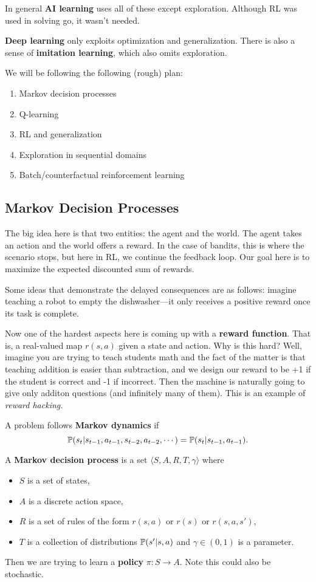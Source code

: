 \documentclass[12pt]{article}
\begin{document}
In general \textbf{AI learning} uses all of these except exploration. Although RL was used in solving go, it wasn't needed.

\textbf{Deep learning} only exploits optimization and generalization. There is also a sense of \textbf{imitation learning}, which also omits exploration.

We will be following the following (rough) plan:
\begin{enumerate}
	\item Markov decision processes
	\item Q-learning
	\item RL and generalization
	\item Exploration in sequential domains 
	\item Batch/counterfactual reinforcement learning
\end{enumerate}

\subsection{Markov Decision Processes}
The big idea here is that two entities: the agent and the world. The agent takes an action and the world offers a reward. In the case of bandits, this is where the scenario stops,
but here in RL, we continue the feedback loop. Our goal here is to maximize the expected discounted sum of rewards.

Some ideas that demonstrate the delayed consequences are as follows: imagine teaching a robot to empty the dishwasher---it only receives a positive reward once its task is complete. 

Now one of the hardest aspects here is coming up with a \textbf{reward function}. That is, a real-valued map $r(s,a)$ given a state and action. Why is this hard?
Well, imagine you are trying to teach students math and the fact of the matter is that teaching addition is easier than subtraction, and we design our reward to be +1 if the student is correct and -1 if incorrect.
Then the machine is naturally going to give only additon questions (and infinitely many of them). This is an example of \textit{reward hacking.}

A problem follows \textbf{Markov dynamics} if 
\[\mathbb{P}(s_t|s_{t-1},a_{t-1},s_{t-2},a_{t-2},\cdots)=\mathbb{P}(s_t|s_{t-1},a_{t-1}).\]
\begin{defn}
	A \textbf{Markov decision process} is a set $\langle S,A,R,T,\gamma\rangle$ where 
	\begin{itemize}
		\item $S$ is a set of states,
		\item $A$ is a discrete action space,
		\item $R$ is a set of rules of the form $r(s,a)$ or $r(s)$ or $r(s,a,s')$,
		\item $T$ is a collection of distributions $\mathbb{P}(s'|s,a)$ and $\gamma\in(0,1)$ is a parameter.
	\end{itemize}

	Then we are trying to learn a \textbf{policy} $\pi:S\to A$. Note this could also be stochastic.
\end{defn}
\end{document}
